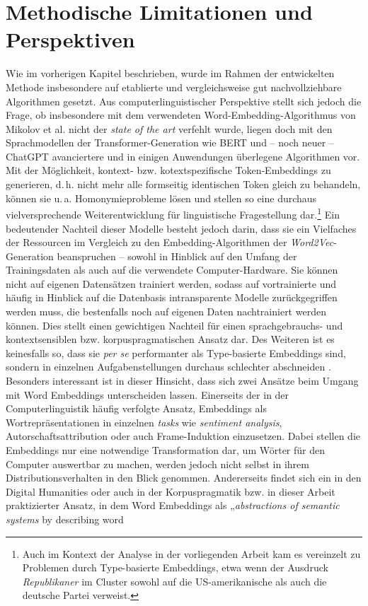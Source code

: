 \section{Methodische Limitationen und Perspektiven}\label{methodische-limitationen-und-perspektiven}

Wie im vorherigen Kapitel beschrieben, wurde im Rahmen der entwickelten Methode insbesondere auf etablierte und vergleichsweise gut nachvollziehbare Algorithmen gesetzt. Aus computerlinguistischer Perspektive stellt sich jedoch die Frage, ob insbesondere mit dem verwendeten Word-Embedding-Algorithmus von Mikolov et al. \autocite*{mikolovEfficientEstimationWord2013} nicht der \emph{state of the art} verfehlt wurde, liegen doch mit den Sprachmodellen der Transformer-Generation wie BERT \autocite{devlinBERTPretrainingDeep2019} und -- noch neuer -- ChatGPT \autocite{openaiGPT4TechnicalReport2023} avanciertere und in einigen Anwendungen überlegene Algorithmen vor. Mit der Möglichkeit, kontext- bzw. kotextspezifische Token-Embeddings zu generieren, d.\,h. nicht mehr alle formseitig identischen Token gleich zu behandeln, können sie u.\,a. Homonymieprobleme lösen und stellen so eine durchaus vielversprechende Weiterentwicklung für linguistische Fragestellung dar.\footnote{Auch im Kontext der Analyse in der vorliegenden Arbeit kam es vereinzelt zu Problemen durch Type-basierte Embeddings, etwa wenn der Ausdruck \emph{Republikaner} im Cluster  sowohl auf die US-amerikanische als auch die deutsche Partei verweist.} Ein bedeutender Nachteil dieser Modelle besteht jedoch darin, dass sie ein Vielfaches der Ressourcen im Vergleich zu den Embedding-Algorithmen der \emph{Word2Vec}-Generation beanspruchen -- sowohl in Hinblick auf den Umfang der Trainingsdaten als auch auf die verwendete Computer-Hardware. Sie können nicht auf eigenen Datensätzen trainiert werden, sodass auf vortrainierte und häufig in Hinblick auf die Datenbasis intransparente Modelle zurückgegriffen werden muss, die bestenfalls noch auf eigenen Daten nachtrainiert werden können. Dies stellt einen gewichtigen Nachteil für einen sprachgebrauchs- und kontextsensiblen bzw. korpuspragmatischen Ansatz dar. Des Weiteren ist es keinesfalls so, dass sie \emph{per se} performanter als Type-basierte Embeddings sind, sondern in einzelnen Aufgabenstellungen durchaus schlechter abschneiden \autocites[siehe etwa][]{brunnerBERTNotBERT2020, ehrmanntrautTypeTokenbasedWord2021, lenciComparativeEvaluationAnalysis2022}. Besonders interessant ist in dieser Hinsicht, dass sich zwei Ansätze beim Umgang mit Word Embeddings unterscheiden lassen. Einerseits der in der Computerlinguistik häufig verfolgte Ansatz, Embeddings als Wortrepräsentationen in einzelnen \emph{tasks} wie \emph{sentiment analysis}, Autorschaftsattribution oder auch Frame-Induktion einzusetzen. Dabei stellen die Embeddings nur eine notwendige Transformation dar, um Wörter für den Computer auswertbar zu machen, werden jedoch nicht selbst in ihrem Distributionsverhalten in den Blick genommen. Andererseits findet sich ein in den Digital Humanities oder auch in der Korpuspragmatik bzw. in dieser Arbeit praktizierter Ansatz, in dem Word Embeddings als „\emph{abstractions of semantic systems} by describing word 
